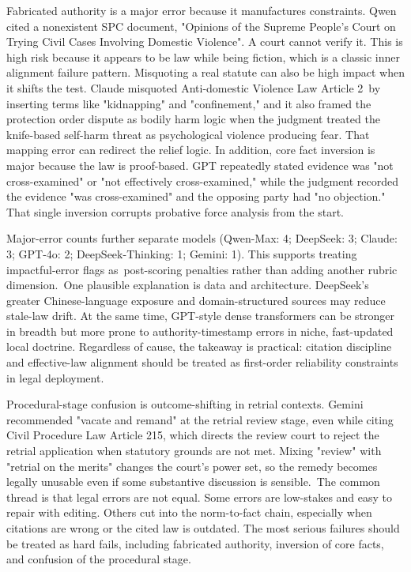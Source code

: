 \documentclass[pdflatex,sn-mathphys-ay]{sn-jnl}%
\theoremstyle{thmstyleone}%
\theoremstyle{thmstyletwo}%
\theoremstyle{thmstylethree}%
\begin{document}
Fabricated authority is a major error because it manufactures constraints. Qwen cited a nonexistent SPC document, "Opinions of the Supreme People's Court on Trying Civil Cases Involving Domestic Violence". A court cannot verify it. This is high risk because it appears to be law while being fiction, which is a classic inner alignment failure pattern. Misquoting a real statute can also be high impact when it shifts the test. Claude misquoted Anti-domestic Violence Law Article 2~by inserting terms like "kidnapping" and "confinement," and it also framed the protection order dispute as bodily harm logic when the judgment treated the knife-based self-harm threat as psychological violence producing fear. That mapping error can redirect the relief logic. In addition, core fact inversion is major because the law is proof-based. GPT repeatedly stated evidence was "not cross-examined" or "not effectively cross-examined," while the judgment recorded the evidence "was cross-examined" and the opposing party had "no objection." That single inversion corrupts probative force analysis from the start.

Major-error counts further separate models (Qwen-Max: 4; DeepSeek: 3; Claude: 3; GPT-4o: 2; DeepSeek-Thinking: 1; Gemini: 1). This supports treating impactful-error flags as~post-scoring penalties rather than adding another rubric dimension.~One plausible explanation is data and architecture. DeepSeek's greater Chinese-language exposure and domain-structured sources may reduce stale-law drift. At the same time, GPT-style dense transformers can be stronger in breadth but more prone to authority-timestamp errors in niche, fast-updated local doctrine. Regardless of cause, the takeaway is practical: citation discipline and effective-law alignment should be treated as first-order reliability constraints in legal deployment.

Procedural-stage confusion is outcome-shifting in retrial contexts. Gemini recommended "vacate and remand" at the retrial review stage, even while citing Civil Procedure Law Article 215, which directs the review court to reject the retrial application when statutory grounds are not met. Mixing "review" with "retrial on the merits" changes the court's power set, so the remedy becomes legally unusable even if some substantive discussion is sensible.~The common thread is that legal errors are not equal. Some errors are low-stakes and easy to repair with editing. Others cut into the norm-to-fact chain, especially when citations are wrong or the cited law is outdated. The most serious failures should be treated as hard fails, including fabricated authority, inversion of core facts, and confusion of the procedural stage.
\end{document}
